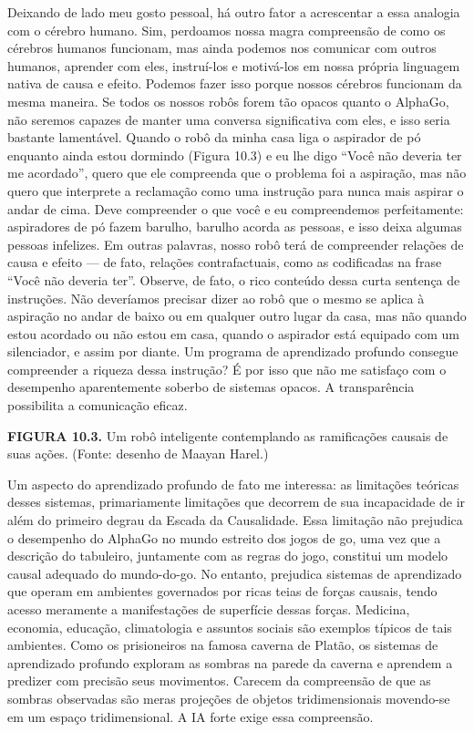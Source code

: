 \documentclass[11pt,a5paper,twoside]{book}
\begin{document}
Deixando de lado meu gosto pessoal, há outro fator a acrescentar a essa analogia com o cérebro humano. Sim, perdoamos nossa magra compreensão de como os cérebros humanos funcionam, mas ainda podemos nos comunicar com outros humanos, aprender com eles, instruí-los e motivá-los em nossa própria linguagem nativa de causa e efeito. Podemos fazer isso porque nossos cérebros funcionam da mesma maneira. Se todos os nossos robôs forem tão opacos quanto o AlphaGo, não seremos capazes de manter uma conversa significativa com eles, e isso seria bastante lamentável. Quando o robô da minha casa liga o aspirador de pó enquanto ainda estou dormindo (Figura 10.3) e eu lhe digo “Você não deveria ter me acordado”, quero que ele compreenda que o problema foi a aspiração, mas não quero que interprete a reclamação como uma instrução para nunca mais aspirar o andar de cima. Deve compreender o que você e eu compreendemos perfeitamente: aspiradores de pó fazem barulho, barulho acorda as pessoas, e isso deixa algumas pessoas infelizes. Em outras palavras, nosso robô terá de compreender relações de causa e efeito — de fato, relações contrafactuais, como as codificadas na frase “Você não deveria ter”. Observe, de fato, o rico conteúdo dessa curta sentença de instruções. Não deveríamos precisar dizer ao robô que o mesmo se aplica à aspiração no andar de baixo ou em qualquer outro lugar da casa, mas não quando estou acordado ou não estou em casa, quando o aspirador está equipado com um silenciador, e assim por diante. Um programa de aprendizado profundo consegue compreender a riqueza dessa instrução? É por isso que não me satisfaço com o desempenho aparentemente soberbo de sistemas opacos. A transparência possibilita a comunicação eficaz.

\textbf{FIGURA 10.3.} Um robô inteligente contemplando as ramificações causais de suas ações. (Fonte: desenho de Maayan Harel.)

Um aspecto do aprendizado profundo de fato me interessa: as limitações teóricas desses sistemas, primariamente limitações que decorrem de sua incapacidade de ir além do primeiro degrau da Escada da Causalidade. Essa limitação não prejudica o desempenho do AlphaGo no mundo estreito dos jogos de go, uma vez que a descrição do tabuleiro, juntamente com as regras do jogo, constitui um modelo causal adequado do mundo-do-go. No entanto, prejudica sistemas de aprendizado que operam em ambientes governados por ricas teias de forças causais, tendo acesso meramente a manifestações de superfície dessas forças. Medicina, economia, educação, climatologia e assuntos sociais são exemplos típicos de tais ambientes. Como os prisioneiros na famosa caverna de Platão, os sistemas de aprendizado profundo exploram as sombras na parede da caverna e aprendem a predizer com precisão seus movimentos. Carecem da compreensão de que as sombras observadas são meras projeções de objetos tridimensionais movendo-se em um espaço tridimensional. A IA forte exige essa compreensão.
\end{document}

